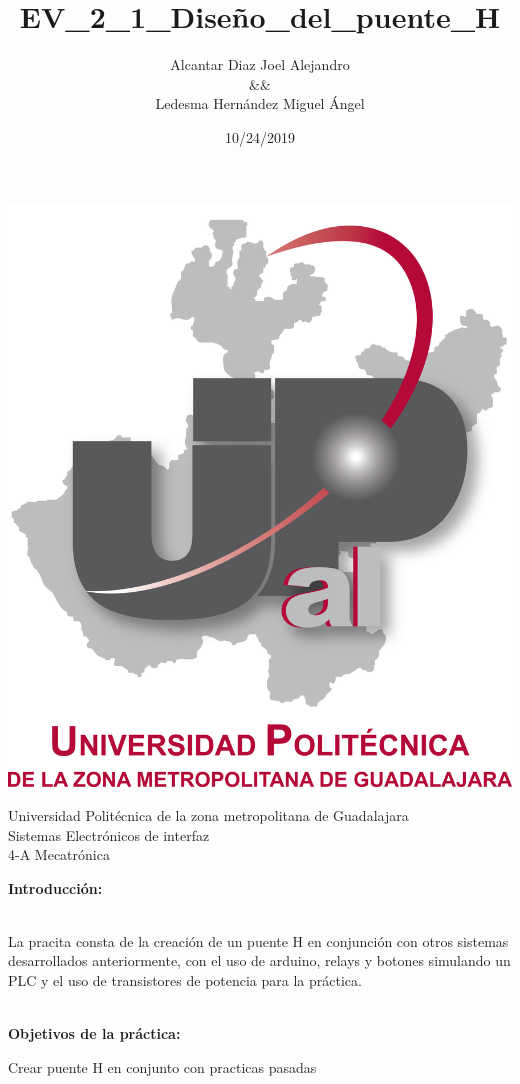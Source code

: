 \documentclass[letterpaper]{article}
\title{EV\_2\_1\_Diseño\_del\_puente\_H}
\author{Alcantar Diaz Joel Alejandro \\\&\&\\ Ledesma Hernández Miguel Ángel}
\date{10/24/2019}
\begin{document}
\maketitle
\vspace{2cm}
\begin{center}
    \includegraphics[scale=0.5]{Img/UPZMGlog.png}
\end{center}
\vspace{2cm}
\begin{large}
\begin{center}
Universidad Politécnica de la zona metropolitana de Guadalajara\\
Sistemas Electrónicos de interfaz\\
4-A Mecatrónica\\
\end{center}
\end{large}
\newpage
\begin{huge}
\textbf{Introducción:}\\\\
\end{huge}
La pracita consta de la creación de un puente H en conjunción con otros sistemas desarrollados anteriormente, con el uso de arduino, relays y botones simulando un PLC y el uso de transistores de potencia para la práctica.\\\\
\vspace{.2cm}
\begin{huge}
\textbf{Objetivos de la práctica:}\\
\end{huge}
Crear puente H en conjunto con practicas pasadas\\
\end{document}
